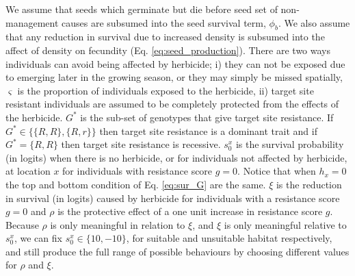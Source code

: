 \documentclass[12pt, a4paper]{article}
\begin{document}
We assume that seeds which germinate but die before seed set of non-management causes are subsumed into the seed survival term, $\phi_b$. We also assume that any reduction in survival due to increased density is subsumed into the affect of density on fecundity (Eq. \ref{eq:seed_production}). There are two ways individuals can avoid being affected by herbicide; i) they can not be exposed due to emerging later in the growing season, or they may simply be missed spatially, $\varsigma$ is the proportion of individuals exposed to the herbicide, ii) target site resistant individuals are assumed to be completely protected from the effects of the herbicide. $G^*$ is the sub-set of genotypes that give target site resistance. If $G^* \in \{\{R, R\}, \{R, r\}\}$ then target site resistance is a dominant trait and if $G^* = \{R, R\}$ then target site resistance is recessive. $s_0^x$ is the survival probability (in logits) when there is no herbicide, or for individuals not affected by herbicide, at location $x$ for individuals with resistance score $g = 0$. Notice that when $h_x = 0$ the top and bottom condition of Eq. \ref{eq:sur_G} are the same. $\xi$ is the reduction in survival (in logits) caused by herbicide for individuals with a resistance score $g = 0$ and $\rho$ is the protective effect of a one unit increase in resistance score $g$. Because $\rho$ is only meaningful in relation to $\xi$, and $\xi$ is only meaningful relative to $s_0^x$, we can fix $s_0^x \in \{10, -10\}$, for suitable and unsuitable habitat respectively, and still produce the full range of possible behaviours by choosing different values for $\rho$ and $\xi$. 
\end{document}
